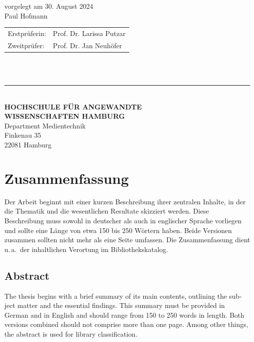 \begin{titlepage}
  vorgelegt am 30. August 2024\\
  Paul Hofmann

  \vspace{5cm}

  \hspace*{37mm}
  \begin{minipage}{0.5\linewidth}
    \begin{tabular}{@{}ll}
      Erstprüferin: & Prof. Dr. Larissa Putzar\\[-.3mm]
      Zweitprüfer: & Prof. Dr. Jan Neuhöfer \\
    \end{tabular}\\

    \,\rule{9mm}{1mm}\\[1.5mm]

    \textbf{HOCHSCHULE FÜR ANGEWANDTE}\\
    \textbf{WISSENSCHAFTEN HAMBURG}\\
    Department Medientechnik\\
    Finkenau 35\\
    22081 Hamburg
  \end{minipage}
\end{titlepage}
\restoregeometry

\thispagestyle{empty}

\section*{Zusammenfassung}

Der Arbeit beginnt mit einer kurzen Beschreibung ihrer zentralen Inhalte, in
der die Thematik und die wesentlichen Resultate skizziert werden.  Diese
Beschreibung muss sowohl in deutscher als auch in englischer Sprache vorliegen
und sollte eine Länge von etwa 150 bis 250 Wörtern haben.  Beide Versionen
zusammen sollten nicht mehr als eine Seite umfassen.  Die Zusammenfassung
dient u.\,a.\ der inhaltlichen Verortung im Bibliothekskatalog.

{
  \begin{otherlanguage}{english}
    \section*{Abstract}

    The thesis begins with a brief summary of its main contents, outlining the
    subject matter and the essential findings.  This summary must be provided
    in German and in English and should range from 150 to 250 words in length.
    Both versions combined should not comprise more than one page.  Among
    other things, the abstract is used for library classification.
  \end{otherlanguage}
}
